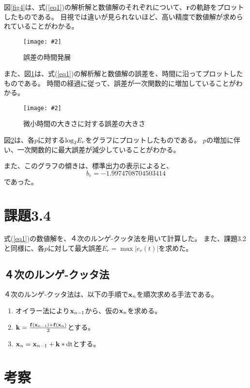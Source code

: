 \documentclass[11pt]{jsarticle}
\newcommand{\fg}[3]{ %
	\begin{figure}
		\texttt{[image: \#2]}
		\caption{#3}
		\label{#1}
	\end{figure}
}
\newcommand{\fr}[1]{図\ref{#1}}
\newcommand{\er}[1]{式(\ref{#1})}
\begin{document}
            \fr{fig4}は、\er{eq1}の解析解と数値解のそれぞれについて、${\bf r}$の軌跡をプロットしたものである。
            目視では違いが見られないほど、高い精度で数値解が求められていることがわかる。

            \fg{fig5}{graphs/heun/error_by_time.eps}{誤差の時間発展}

            また、\fr{fig5}は、\er{eq1}の解析解と数値解の誤差を、時間に沿ってプロットしたものである。
            時間の経過に従って、誤差が一次関数的に増加していることがわかる。

            \fg{fig6}{graphs/heun/error_by_p.eps}{微小時間の大きさに対する誤差の大きさ}

            \fr{fig6}は、各$p$に対する${\rm log}_2E_r$をグラフにプロットしたものである。
            $p$の増加に伴い、一次関数的に最大誤差が減少していることがわかる。

            また、このグラフの傾きは、標準出力の表示によると、
            \[
                b_e = -1.9974708704503414
            \]
            であった。

    \section{課題3.4}
        \er{eq1}の数値解を、４次のルンゲ-クッタ法を用いて計算した。
        また、課題3.2と同様に、各$p$に対して最大誤差$E_r = \max|e_r(t)|$を求めた。

        \subsection{４次のルンゲ-クッタ法}
            ４次のルンゲ-クッタ法は、以下の手順で${\bf x}_{n}$を順次求める手法である。

            \begin{enumerate}
                \item オイラー法により${\bf x}_{n-1}$から、仮の${\bf x}_{n}$を求める。
                \item ${\bf k} = \frac{{\bf f}({\bf x}_{n-1}) + {\bf f}({\bf x}_{n})}{2}$とする。
                \item ${\bf x}_{n} = {\bf x}_{n-1} + {\bf k} * {\rm dt}$とする。
            \end{enumerate}

    \section{考察}
\end{document}
